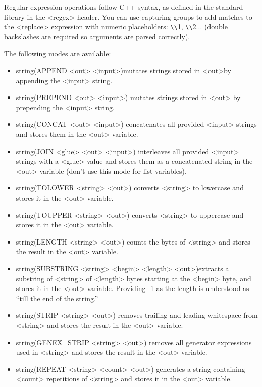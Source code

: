Regular expression operations follow C++ syntax, as defined in the standard library in the <regex> header. You can use capturing groups to add matches to the <replace> expression with numeric placeholders: \verb|\\|1, \verb|\\|2... (double backslashes are required so arguments are parsed correctly).


The following modes are available:

\begin{itemize}
\item
string(APPEND <out> <input>)mutates strings stored in <out>by appending the <input> string.

\item
string(PREPEND <out> <input>) mutates strings stored in <out> by prepending the <input> string.

\item
string(CONCAT <out> <input>) concatenates all provided <input> strings and stores them in the <out> variable.

\item
string(JOIN <glue> <out> <input>) interleaves all provided <input> strings with a <glue> value and stores them as a concatenated string in the <out> variable (don’t use this mode for list variables).

\item
string(TOLOWER <string> <out>) converts <string> to lowercase and stores it in the <out> variable.

\item
string(TOUPPER <string> <out>) converts <string> to uppercase and stores it in the <out> variable.

\item
string(LENGTH <string> <out>) counts the bytes of <string> and stores the result in the <out> variable.

\item
string(SUBSTRING <string> <begin> <length> <out>)extracts a substring of <string> of <length> bytes starting at the <begin> byte, and stores it in the <out> variable. Providing -1 as the length is understood as “till the end of the string.”

\item
string(STRIP <string> <out>) removes trailing and leading whitespace from <string> and stores the result in the <out> variable.

\item
string(GENEX\_STRIP <string> <out>) removes all generator expressions used in <string> and stores the result in the <out> variable.

\item
string(REPEAT <string> <count> <out>) generates a string containing <count> repetitions of <string> and stores it in the <out> variable.
\end{itemize}

